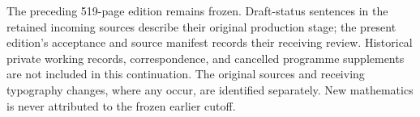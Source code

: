 The preceding 519-page edition remains frozen. Draft-status sentences in
the retained incoming sources describe their original production stage;
the present edition's acceptance and source manifest records their
receiving review. Historical private working records, correspondence,
and cancelled programme supplements are not included in this
continuation. The original sources and receiving typography changes,
where any occur, are identified separately. New mathematics is never
attributed to the frozen earlier cutoff.

